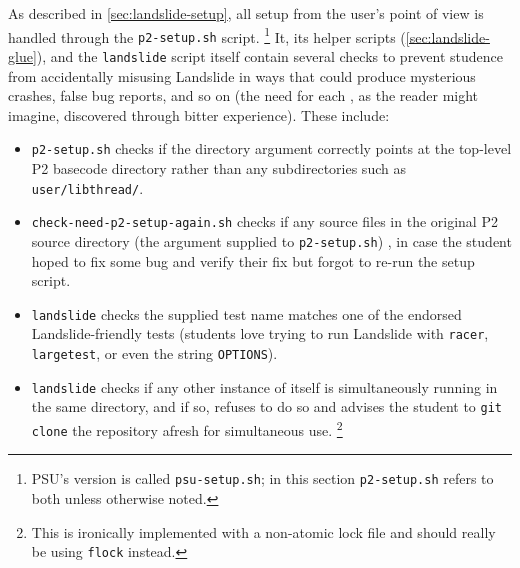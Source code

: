 As described in \cref{sec:landslide-setup},
all setup from the user's point of view is handled through the {\tt p2-setup.sh} script.%
\footnote{PSU's version is called {\tt psu-setup.sh};
in this section {\tt p2-setup.sh} refers to both unless otherwise noted.
}
It, its helper scripts (\cref{sec:landslide-glue}),
and the {\tt landslide} script itself contain several checks to prevent
studence
from accidentally misusing Landslide in ways that could produce mysterious crashes, false bug reports, and so on
(the need for each , as the reader might imagine, discovered through bitter experience).
These include:
\begin{itemize}
	\item {\tt p2-setup.sh} checks if the directory argument correctly points at the top-level P2 basecode directory
		rather than any subdirectories such as {\tt user/libthread/}.
	\item {\tt check-need-p2-setup-again.sh} checks if any source files in the original P2 source directory
		(the argument supplied to {\tt p2-setup.sh}) ,
		in case the student hoped to fix some bug and verify their fix but forgot to re-run the setup script.
	\item {\tt landslide} checks the supplied test name matches one of the endorsed Landslide-friendly tests
		(students love trying to run Landslide with {\tt racer}, {\tt largetest},
		or even the string {\tt OPTIONS}).
	\item {\tt landslide} checks if any other instance of itself is simultaneously running in the same directory,
		and if so, refuses to do so and advises the student
		to {\tt git clone} the repository afresh for simultaneous use.%
		\footnote{This is ironically implemented with a non-atomic lock file
		and should really be using {\tt flock} instead.
		}
\end{itemize}
\vspace{1em}

